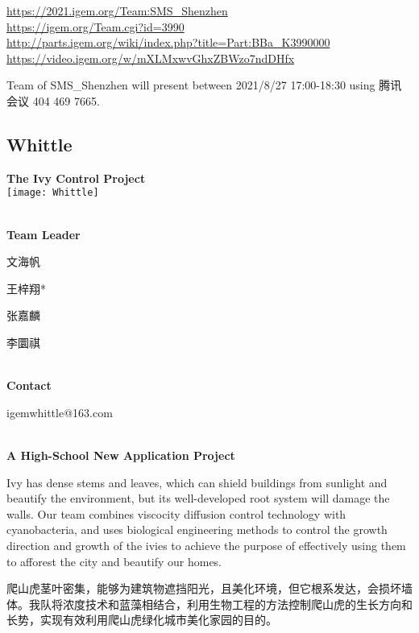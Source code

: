 \url{https://2021.igem.org/Team:SMS\_Shenzhen }\\
\url{https://igem.org/Team.cgi?id=3990 }\\
\url{http://parts.igem.org/wiki/index.php?title=Part:BBa_K3990000 }\\
\url{https://video.igem.org/w/mXLMxwvGhxZBWzo7ndDHfx }\\

\vfill{}









Team of SMS\_Shenzhen will present between   2021/8/27 17:00-18:30      using 腾讯会议 404 469 7665.
\newpage


\subsection{\textcolor{Blu}{ Whittle } }
\vspace{5mm}
\begin{center}
\large{
  \textbf{ The Ivy Control Project }\\
  \texttt{[image: Whittle]}
}
\end{center}
\textbf{\\Team Leader}

  文海帆

  王梓翔*

  张嘉麟

  李圜祺


\textbf{\\Contact}

  igemwhittle@163.com


\textbf{\\A High-School New Application Project\\}\begin{spacing}{1.5}

Ivy has dense stems and leaves, which can shield buildings from sunlight and beautify the environment, but its well-developed root system will damage the walls. Our team combines viscocity diffusion control technology with cyanobacteria, and uses biological engineering methods to control the growth direction and growth of the ivies to achieve the purpose of effectively using them to afforest the city and beautify our homes.

爬山虎茎叶密集，能够为建筑物遮挡阳光，且美化环境，但它根系发达，会损坏墙体。我队将浓度技术和蓝藻相结合，利用生物工程的方法控制爬山虎的生长方向和长势，实现有效利用爬山虎绿化城市美化家园的目的。\end{spacing}
\\

